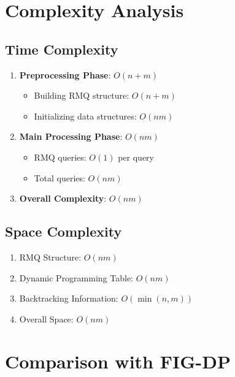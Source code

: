 \documentclass{article}
\begin{document}
\section{Complexity Analysis}

\subsection{Time Complexity}
\begin{enumerate}
    \item \textbf{Preprocessing Phase}: $O(n + m)$
    \begin{itemize}
        \item Building RMQ structure: $O(n + m)$
        \item Initializing data structures: $O(nm)$
    \end{itemize}

    \item \textbf{Main Processing Phase}: $O(nm)$
    \begin{itemize}
        \item RMQ queries: $O(1)$ per query
        \item Total queries: $O(nm)$
    \end{itemize}

    \item \textbf{Overall Complexity}: $O(nm)$
\end{enumerate}

\subsection{Space Complexity}
\begin{enumerate}
    \item RMQ Structure: $O(nm)$
    \item Dynamic Programming Table: $O(nm)$
    \item Backtracking Information: $O(\min(n,m))$
    \item Overall Space: $O(nm)$
\end{enumerate}

\section{Comparison with FIG-DP}
\end{document}
